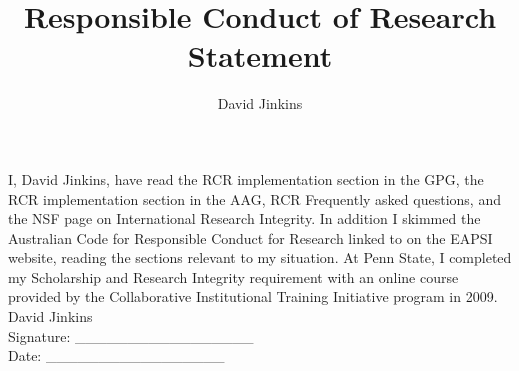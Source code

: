 \documentclass[a4paper,10pt]{article}
\title{Responsible Conduct of Research Statement}
\author{David Jinkins}
\begin{document}
\maketitle
I, David Jinkins, have read the RCR implementation section in the GPG, the RCR implementation section in the AAG, RCR Frequently asked questions, and the NSF page on International Research Integrity.  In addition I skimmed the Australian Code for Responsible Conduct for Research linked to on the EAPSI website, reading the sections relevant to my situation.  At Penn State, I completed my Scholarship and Research Integrity requirement with an online course provided by the Collaborative Institutional Training Initiative program in 2009.\\

David Jinkins\\

Signature: \_\_\_\_\_\_\_\_\_\_\_\_\_\_\_\_\_\\

Date: \_\_\_\_\_\_\_\_\_\_\_\_\_\_\_\_\_
\end{document}
